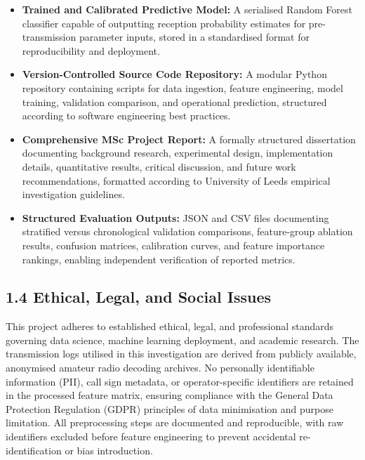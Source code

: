 \begin{itemize}
\tightlist
\item
  \textbf{Trained and Calibrated Predictive Model:} A serialised Random
  Forest classifier capable of outputting reception probability
  estimates for pre-transmission parameter inputs, stored in a
  standardised format for reproducibility and deployment.
\item
  \textbf{Version-Controlled Source Code Repository:} A modular Python
  repository containing scripts for data ingestion, feature engineering,
  model training, validation comparison, and operational prediction,
  structured according to software engineering best practices.
\item
  \textbf{Comprehensive MSc Project Report:} A formally structured
  dissertation documenting background research, experimental design,
  implementation details, quantitative results, critical discussion, and
  future work recommendations, formatted according to University of
  Leeds empirical investigation guidelines.
\item
  \textbf{Structured Evaluation Outputs:} JSON and CSV files documenting
  stratified versus chronological validation comparisons, feature-group
  ablation results, confusion matrices, calibration curves, and feature
  importance rankings, enabling independent verification of reported
  metrics.
\end{itemize}

\subsection{1.4 Ethical, Legal, and Social
Issues}\label{ethical-legal-and-social-issues}

This project adheres to established ethical, legal, and professional
standards governing data science, machine learning deployment, and
academic research. The transmission logs utilised in this investigation
are derived from publicly available, anonymised amateur radio decoding
archives. No personally identifiable information (PII), call sign
metadata, or operator-specific identifiers are retained in the processed
feature matrix, ensuring compliance with the General Data Protection
Regulation (GDPR) principles of data minimisation and purpose
limitation. All preprocessing steps are documented and reproducible,
with raw identifiers excluded before feature engineering to prevent
accidental re-identification or bias introduction.

